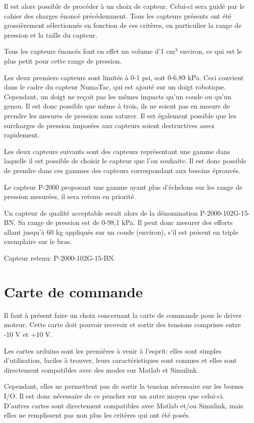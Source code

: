 \documentclass[11pt]{report}
\begin{document}
Il est alors possible de procéder à un choix de capteur. Celui-ci sera guidé par le 
cahier des charges énoncé précédemment. Tous les capteurs présents ont été 
grossièrement sélectionnés en fonction de ces critères, en particulier la range 
de pression et la taille du capteur. 

Tous les capteurs énoncés font en effet un volume d'1 cm$^3$ environ, ce qui est 
le plus petit pour cette range de pression.

Les deux premiers capteurs sont limités à 0-1 psi, soit 0-6,89 kPa. Ceci 
convient dans le cadre du capteur NumaTac, qui est ajouté sur un doigt 
robotique. Cependant, un doigt ne reçoit pas les mêmes impacts qu'un coude ou 
qu'un genou. Il est donc possible que même à trois, ils ne soient pas en mesure 
de prendre les mesures de pression sans saturer. Il est également possible que 
les surcharges de pression imposées aux capteurs soient destructives assez 
rapidement.

Les deux capteurs suivants sont des capteurs représentant une gamme dans 
laquelle il est possible de choisir le capteur que l'on souhaite. Il est donc 
possible de prendre dans ces gammes des capteurs correspondant aux besoins 
éprouvés.

Le capteur P-2000 proposant une gamme ayant plus d'échelons sur les range de pression 
mesurées, il sera retenu en priorité.

Un capteur de qualité acceptable serait alors de la dénomination 
P-2000-102G-15-BN. Sa range de pression est de 0-98,1 kPa.
Il peut donc mesurer des efforts allant jusqu'à 60 kg appliqués sur un 
coude (environ), s'il est présent en triple exemplaire sur le bras. 

Capteur retenu: P-2000-102G-15-BN.




\section{Carte de commande}

Il faut à présent faire un choix concernant la carte de commande pour le driver 
moteur. Cette carte doit pouvoir recevoir et sortir des tensions comprises entre 
-10 V et +10 V. 

Les cartes arduino sont les premières à venir à l'esprit: elles sont simples 
d'utilisation, faciles à trouver, leurs caractéristiques sont connues et elles 
sont directement compatibles avec des modes sur Matlab et Simulink.

Cependant, elles ne permettent pas de sortir la tension nécessaire sur les 
bornes I/O. Il est donc nécessaire de ce pencher sur un autre moyen que 
celui-ci. D'autres cartes sont directement compatibles avec Matlab et/ou 
Simulink, mais elles ne remplissent pas non plus les critères qui ont été posés.
\end{document}
